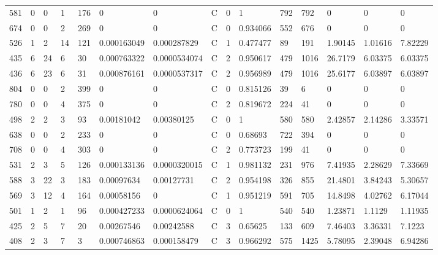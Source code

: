 \begin{latin}
\begin{longtable}{lllllllllllllll}
	581 & 0  & 0   & 1  & 176 & 0              & 0              & C & 0  & 1        & 792  & 792  & 0       & 0       & 0       \\
	674 & 0  & 0   & 2  & 269 & 0              & 0              & C & 0  & 0.934066 & 552  & 676  & 0       & 0       & 0       \\
	526 & 1  & 2   & 14 & 121 & 0.000163049    & 0.000287829    & C & 1  & 0.477477 & 89   & 191  & 1.90145 & 1.01616 & 7.82229 \\
	435 & 6  & 24  & 6  & 30  & 0.000763322    & 0.0000534074   & C & 2  & 0.950617 & 479  & 1016 & 26.7179 & 6.03375 & 6.03375 \\
	436 & 6  & 23  & 6  & 31  & 0.000876161    & 0.0000537317   & C & 2  & 0.956989 & 479  & 1016 & 25.6177 & 6.03897 & 6.03897 \\
	804 & 0  & 0   & 2  & 399 & 0              & 0              & C & 0  & 0.815126 & 39   & 6    & 0       & 0       & 0       \\
	780 & 0  & 0   & 4  & 375 & 0              & 0              & C & 2  & 0.819672 & 224  & 41   & 0       & 0       & 0       \\
	498 & 2  & 2   & 3  & 93  & 0.00181042     & 0.00380125     & C & 0  & 1        & 580  & 580  & 2.42857 & 2.14286 & 3.33571 \\
	638 & 0  & 0   & 2  & 233 & 0              & 0              & C & 0  & 0.68693  & 722  & 394  & 0       & 0       & 0       \\
	708 & 0  & 0   & 4  & 303 & 0              & 0              & C & 2  & 0.773723 & 199  & 41   & 0       & 0       & 0       \\
	531 & 2  & 3   & 5  & 126 & 0.000133136    & 0.0000320015   & C & 1  & 0.981132 & 231  & 976  & 7.41935 & 2.28629 & 7.33669 \\
	588 & 3  & 22  & 3  & 183 & 0.00097634     & 0.00127731     & C & 2  & 0.954198 & 326  & 855  & 21.4801 & 3.84243 & 5.30657 \\
	569 & 3  & 12  & 4  & 164 & 0.00058156     & 0              & C & 1  & 0.951219 & 591  & 705  & 14.8498 & 4.02762 & 6.17044 \\
	501 & 1  & 2   & 1  & 96  & 0.000427233    & 0.0000624064   & C & 0  & 1        & 540  & 540  & 1.23871 & 1.1129  & 1.11935 \\
	425 & 2  & 5   & 7  & 20  & 0.00267546     & 0.00242588     & C & 3  & 0.65625  & 133  & 609  & 7.46403 & 3.36331 & 7.1223  \\
	408 & 2  & 3   & 7  & 3   & 0.000746863    & 0.000158479    & C & 3  & 0.966292 & 575  & 1425 & 5.78095 & 2.39048 & 6.94286 \\

\end{longtable}
\end{latin}
